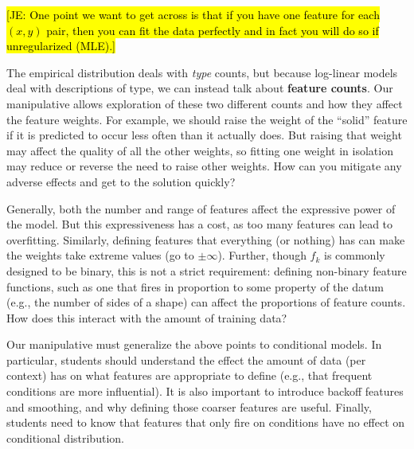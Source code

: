 \documentclass[11pt,letterpaper]{article}
\newcommand{\Note}[1]{}
\renewcommand{\Note}[1]{\hl{[#1]}}  %
\newcommand{\NoteSigned}[3]{{\sethlcolor{#2}\Note{#1: #3}}}
\newcommand{\NoteJE}[1]{\NoteSigned{JE}{LightGreen}{#1}}
\newcommand{\Data}[0]{\ensuremath{\mathcal{D}}}
\begin{document}
\NoteJE{One point we want to get across is that if you have one
  feature for each $(x,y)$ pair, then you can fit the data perfectly
  and in fact you will do so if unregularized (MLE).}

The empirical distribution deals with \textit{type} counts, but because log-linear models 
deal with descriptions of type, we can instead talk about \textbf{feature counts}. Our 
manipulative allows exploration of these two different counts and how they affect the 
feature weights. For example, we should raise the weight of the “solid” feature if it is 
predicted to occur less often than it actually does. But raising that weight 
may affect the quality of all the other weights, so fitting one weight in
isolation may reduce or reverse the need to raise other weights. How can you mitigate any 
adverse effects and get to the solution quickly?

Generally, both the number and range of features affect the expressive 
power of the model. But this expressiveness has a cost, as too many features can lead to overfitting. 
Similarly, defining features that everything (or nothing) has can make the weights 
take extreme values (go to $\pm \infty$). Further, though $f_k$ is commonly designed to be binary, 
this is not a strict requirement: defining non-binary feature functions, such as one that fires in 
proportion to some property of the datum (e.g., the number of sides of a shape) can affect the
proportions of feature counts. How does this interact with the amount of training data?

Our manipulative must generalize the above points to conditional models. In particular, students should 
understand the effect the amount of data (per context) has on what features are appropriate to define 
(e.g., that frequent conditions are more influential). It is also important to introduce backoff features 
and smoothing, and why defining those coarser features are useful. Finally, students need to know that 
features that only fire on conditions have no effect on conditional distribution.

\end{document}
